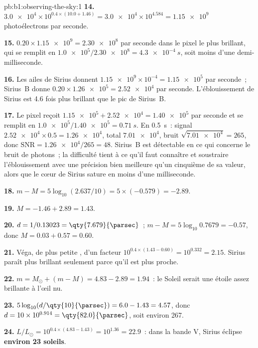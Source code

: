 \begin{solution}{pb:b1:observing-the-sky:1}
\textbf{14.} $\num{3.0e4}\times10^{0.4\times(10.0 + 1.46)} = \num{3.0e4}
\times10^{4.584} = \num{1.15e9}$ photoélectrons par seconde.

\textbf{15.} $0.20\times\num{1.15e9} = \num{2.30e8}$ par seconde dans le pixel
le plus brillant, qui se remplit en $\num{1.0e5}/\num{2.30e8} =
\qty{4.3e-4}{s}$, soit moins d'une demi-milliseconde.

\textbf{16.} Les ailes de Sirius donnent $\num{1.15e9}\times10^{-4} =
\num{1.15e5}$ par seconde~; Sirius~B donne $0.20\times\num{1.26e5} =
\num{2.52e4}$ par seconde. L'éblouissement de Sirius est 4.6 fois plus brillant
que le pic de Sirius~B.

\textbf{17.} Le pixel reçoit $\num{1.15e5} + \num{2.52e4} = \num{1.40e5}$
par seconde et se remplit en $\num{1.0e5}/\num{1.40e5} = \qty{0.71}{s}$. En
\qty{0.5}{s}~: signal $\num{2.52e4}\times0.5 = \num{1.26e4}$, total
$\num{7.01e4}$, bruit $\sqrt{\num{7.01e4}} = 265$, donc $\mathrm{SNR} =
\num{1.26e4}/265 = 48$. Sirius~B est détectable en ce qui concerne le bruit de
photons~; la difficulté tient à ce qu'il faut connaître et soustraire
l'éblouissement avec une précision bien meilleure qu'un cinquième de sa valeur,
alors que le cœur de Sirius sature en moins d'une milliseconde.

\textbf{18.} $m - M = 5\log_{10}(2.637/10) = 5\times(-0.579) = -2.89$.

\textbf{19.} $M = -1.46 + 2.89 = 1.43$.

\textbf{20.} $d = 1/0.13023 = \qty{7.679}{\parsec}$~;
$m - M = 5\log_{10}0.7679 = -0.57$, donc $M = 0.03 + 0.57 = 0.60$.

\textbf{21.} Véga, de plus petite , d'un facteur
$10^{0.4\times(1.43 - 0.60)} = 10^{0.332} = 2.15$. Sirius paraît plus brillant
seulement parce qu'il est plus proche.

\textbf{22.} $m = M_\odot + (m - M) = 4.83 - 2.89 = 1.94$~: le Soleil serait une
étoile assez brillante à l'œil nu.

\textbf{23.} $5\log_{10}(d/\qty{10}{\parsec}) = 6.0 - 1.43 = 4.57$, donc
$d = 10\times10^{0.914} = \qty{82.0}{\parsec}$, soit environ \qty{267}{\lightyear}.

\textbf{24.} $L/L_\odot = 10^{0.4\times(4.83 - 1.43)} = 10^{1.36} = 22.9$~:
dans la bande V, Sirius éclipse \textbf{environ 23 soleils}.
\end{solution}
